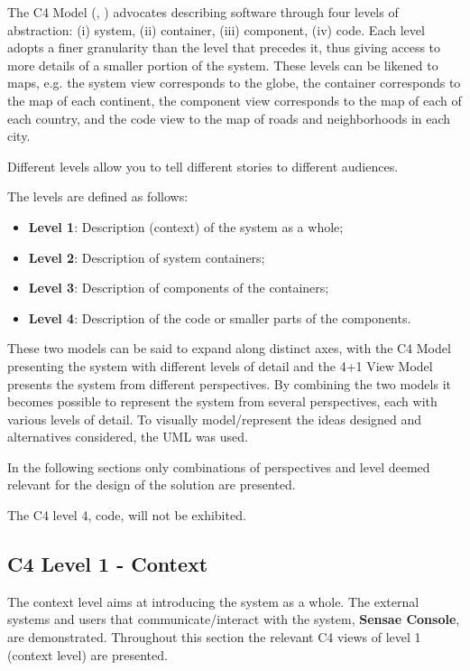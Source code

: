The C4 Model (\cite{c4model-site}, \cite{c4model}) advocates describing software through four levels of abstraction:
(i) system, (ii) container, (iii) component, (iv) code. Each level adopts a finer granularity than the level that precedes it, thus giving access to more details of a smaller portion of the system.
These levels can be likened to maps, e.g. the system view corresponds to the globe, the container corresponds to the map of each continent, the component view corresponds to the map of each of each country, and the code view to the map of roads and neighborhoods in each city.

Different levels allow you to tell different stories to different audiences.

The levels are defined as follows:
\begin{itemize}
   \item \textbf{Level 1}: Description (context) of the system as a whole;
   \item \textbf{Level 2}: Description of system containers;
   \item \textbf{Level 3}: Description of components of the containers;
   \item \textbf{Level 4}: Description of the code or smaller parts of the components.
\end{itemize}

These two models can be said to expand along distinct axes, with the
C4 Model presenting the system with different levels of detail and the 4+1 View Model presents the system from different perspectives. By combining the two models it becomes possible to represent the system from several perspectives, each with various levels of detail.
To visually model/represent the ideas designed and alternatives considered, the \gls{UML} was used.

In the following sections only combinations of perspectives and level deemed relevant for the design of the solution are presented.

The C4 level 4, code, will not be exhibited.

\subsection{C4 Level 1 - Context}
\label{subsec:design:architecture:context}

The context level aims at introducing the system as a whole. The external systems and users that communicate/interact with the system, \textbf{Sensae Console}, are demonstrated.
Throughout this section the relevant C4 views of level 1 (context level) are presented.


